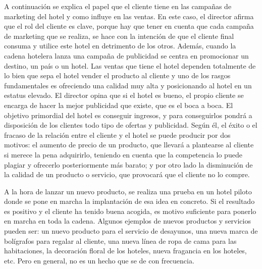 A continuación se explica el papel que el cliente tiene en las campañas de marketing del hotel y como influye en las ventas. En este caso, el director afirma que el rol del cliente es clave, porque hay que tener en cuenta que cada campaña de marketing que se realiza, se hace con la intención de que el cliente final consuma y utilice este hotel en detrimento de los otros. Además, cuando la cadena hotelera lanza una campaña de publicidad se centra en promocionar un destino, un país o un hotel. Las ventas que tiene el hotel dependen totalmente de lo bien que sepa el hotel vender el producto al cliente y uno de los rasgos fundamentales es ofreciendo una calidad muy alta y posicionando al hotel en un estatus elevado. El director opina que si el hotel es bueno, el propio cliente se encarga de hacer la mejor publicidad que existe, que es el boca a boca. El objetivo primordial del hotel es conseguir ingresos, y para conseguirlos pondrá a disposición de los clientes todo tipo de ofertas y publicidad. Según él, el éxito o el fracaso de la relación entre el cliente y el hotel se puede producir por dos motivos: el aumento de precio de un producto, que llevará a plantearse al cliente si merece la pena adquirirlo, teniendo en cuenta que la competencia lo puede plagiar y ofrecerlo posteriormente más barato; y por otro lado la disminución de la calidad de un producto o servicio, que provocará que el cliente no lo compre.

A la hora de lanzar un nuevo producto, se realiza una prueba en un hotel piloto donde se pone en marcha la implantación de esa idea en concreto. Si el resultado es positivo y el cliente ha tenido buena acogida, es motivo suficiente para ponerlo en marcha en toda la cadena. Algunos ejemplos de nuevos productos y servicios pueden ser: un nuevo producto para el servicio de desayunos, una nueva marca de bolígrafos para regalar al cliente, una nueva línea de ropa de cama para las habitaciones, la decoración floral de los hoteles, nueva fragancia en los hoteles, etc. Pero en general, no es un hecho que se de con frecuencia.
